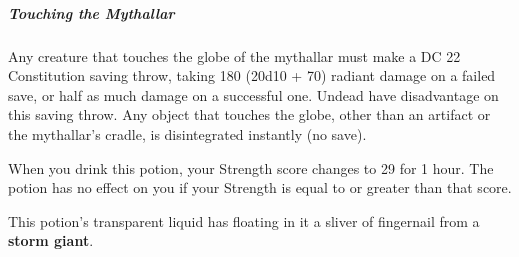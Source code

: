 \documentclass[10pt,a4paper,twoside,bg=print,twocolumn,openany,nodeprecatedcode]{dndbook}
\begin{document}
\subparagraph{Touching the Mythallar}
Any creature that touches the globe of the mythallar must make a DC 22 Constitution saving throw, taking 180 (20d10 + 70) radiant damage on a failed save, or half as much damage on a successful one. Undead have disadvantage on this saving throw. Any object that touches the globe, other than an artifact or the mythallar's cradle, is disintegrated instantly (no save).

When you drink this potion, your Strength score changes to 29 for 1 hour. The potion has no effect on you if your Strength is equal to or greater than that score.

This potion's transparent liquid has floating in it a sliver of fingernail from a \textbf{storm giant}.
\end{document}
